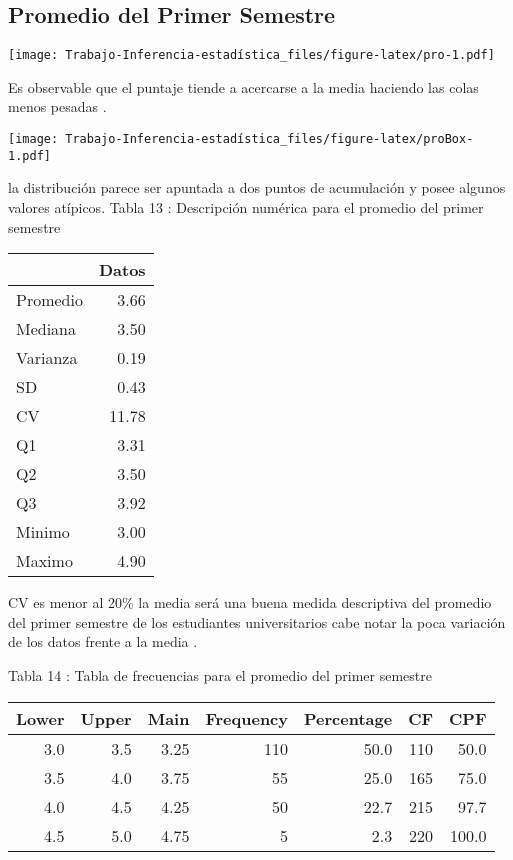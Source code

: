 \documentclass[
  man]{apa6}
\begin{document}
\hypertarget{promedio-del-primer-semestre}{%
\subsection{Promedio del Primer Semestre}\label{promedio-del-primer-semestre}}

\texttt{[image: Trabajo-Inferencia-estadística\_files/figure-latex/pro-1.pdf]}

Es observable que el puntaje tiende a acercarse a la media haciendo las
colas menos pesadas .

\texttt{[image: Trabajo-Inferencia-estadística\_files/figure-latex/proBox-1.pdf]}

la distribución parece ser apuntada a dos puntos de acumulación y posee
algunos valores atípicos. \clearpage Tabla 13 : Descripción numérica
para el promedio del primer semestre

\begin{center}

\begin{tabular}{l|r}
\hline
  & Datos\\
\hline
Promedio & 3.66\\
\hline
Mediana & 3.50\\
\hline
Varianza & 0.19\\
\hline
SD & 0.43\\
\hline
CV & 11.78\\
\hline
Q1 & 3.31\\
\hline
Q2 & 3.50\\
\hline
Q3 & 3.92\\
\hline
Minimo & 3.00\\
\hline
Maximo & 4.90\\
\hline
\end{tabular}
\end{center}

CV es menor al 20\% la media será una buena medida descriptiva del
promedio del primer semestre de los estudiantes universitarios cabe
notar la poca variación de los datos frente a la media .

Tabla 14 : Tabla de frecuencias para el promedio del primer semestre

\begin{center}


\begin{tabular}{r|r|r|r|r|r|r}
\hline
Lower & Upper & Main & Frequency & Percentage & CF & CPF\\
\hline
3.0 & 3.5 & 3.25 & 110 & 50.0 & 110 & 50.0\\
\hline
3.5 & 4.0 & 3.75 & 55 & 25.0 & 165 & 75.0\\
\hline
4.0 & 4.5 & 4.25 & 50 & 22.7 & 215 & 97.7\\
\hline
4.5 & 5.0 & 4.75 & 5 & 2.3 & 220 & 100.0\\
\hline
\end{tabular}
\end{center}
\end{document}
